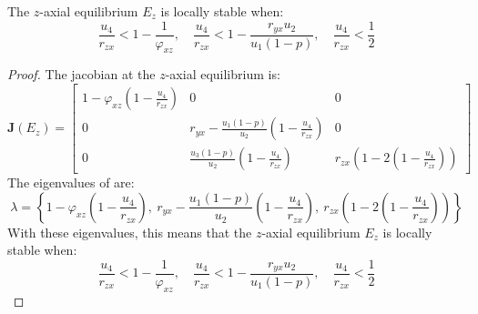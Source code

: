 \begin{theorem}\label{thm:axial-z-stability}
    The $z$-axial equilibrium $E_z$ is locally stable when:
    \begin{equation*}
        \frac{u_4}{r_{zx}} < 1-\frac{1}{\varphi_{xz}},\quad
        \frac{u_4}{r_{zx}} < 1-\frac{r_{yx}u_2}{u_1\left(1-p\right)},\quad
        \frac{u_4}{r_{zx}} < \frac{1}{2}
    \end{equation*}
\end{theorem}
\begin{proof}
    The jacobian at the $z$-axial equilibrium is:
    \begin{equation}\label{matrix:jacobian-axial-z}
        \textbf{J}\left(E_z\right) = \begin{bmatrix}
            1-\varphi_{xz}\left(1-\frac{u_4}{r_{zx}}\right) & 0 & 0\\
            0 & r_{yx}-\frac{u_1\left(1-p\right)}{u_2}\left(1-\frac{u_4}{r_{zx}}\right) & 0\\
            0 & \frac{u_3\left(1-p\right)}{u_2}\left(1-\frac{u_4}{r_{zx}}\right) & r_{zx}\left(1-2\left(1-\frac{u_4}{r_{zx}}\right)\right)
        \end{bmatrix}
    \end{equation}
    The eigenvalues of  are:
    \begin{equation*}
        \lambda=\left\{1-\varphi_{xz}\left(1-\frac{u_4}{r_{zx}}\right),\ r_{yx}-\frac{u_1\left(1-p\right)}{u_2}\left(1-\frac{u_4}{r_{zx}}\right),\ r_{zx}\left(1-2\left(1-\frac{u_4}{r_{zx}}\right)\right)\right\}
    \end{equation*}
    With these eigenvalues, this means that the $z$-axial equilibrium $E_z$ is locally stable when:
    \begin{equation*}
        \frac{u_4}{r_{zx}} < 1-\frac{1}{\varphi_{xz}},\quad
        \frac{u_4}{r_{zx}} < 1-\frac{r_{yx}u_2}{u_1\left(1-p\right)},\quad
        \frac{u_4}{r_{zx}} < \frac{1}{2}
    \end{equation*}
\end{proof}

